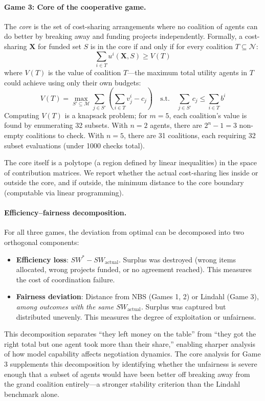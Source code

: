 \paragraph{Game 3: Core of the cooperative game.}
The \emph{core} is the set of cost-sharing arrangements where no coalition of agents can do better by breaking away and funding projects independently.
Formally, a cost-sharing $\bm{X}$ for funded set $S$ is in the core if and only if for every coalition $T \subseteq \mathcal{N}$:
\begin{equation}
    \sum_{i \in T} u^i(\bm{X}, S) \geq V(T)
\end{equation}
where $V(T)$ is the value of coalition $T$---the maximum total utility agents in $T$ could achieve using only their own budgets:
\begin{equation}
    V(T) = \max_{S' \subseteq \mathcal{M}} \sum_{j \in S'} \left(\sum_{i \in T} v^i_j - c_j\right) \quad \text{s.t.} \quad \sum_{j \in S'} c_j \leq \sum_{i \in T} b^i
\end{equation}
Computing $V(T)$ is a knapsack problem; for $m=5$, each coalition's value is found by enumerating 32 subsets.
With $n=2$ agents, there are $2^n - 1 = 3$ non-empty coalitions to check.
With $n=5$, there are 31 coalitions, each requiring 32 subset evaluations (under 1000 checks total).

The core itself is a polytope (a region defined by linear inequalities) in the space of contribution matrices.
We report whether the actual cost-sharing lies inside or outside the core, and if outside, the minimum distance to the core boundary (computable via linear programming).

\paragraph{Efficiency--fairness decomposition.}
For all three games, the deviation from optimal can be decomposed into two orthogonal components:
\begin{itemize}
    \item \textbf{Efficiency loss}: $SW^* - SW_{\text{actual}}$. Surplus was destroyed (wrong items allocated, wrong projects funded, or no agreement reached). This measures the cost of coordination failure.
    \item \textbf{Fairness deviation}: Distance from NBS (Games 1, 2) or Lindahl (Game 3), \emph{among outcomes with the same $SW_{\text{actual}}$}. Surplus was captured but distributed unevenly. This measures the degree of exploitation or unfairness.
\end{itemize}
This decomposition separates ``they left money on the table'' from ``they got the right total but one agent took more than their share,'' enabling sharper analysis of how model capability affects negotiation dynamics.
The core analysis for Game 3 supplements this decomposition by identifying whether the unfairness is severe enough that a subset of agents would have been better off breaking away from the grand coalition entirely---a stronger stability criterion than the Lindahl benchmark alone.
